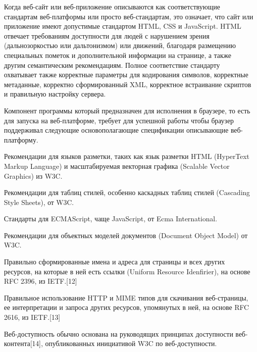 Когда веб-сайт или веб-приложение описываются как соответствующие стандартам веб-платформы или просто веб-стандартам, это означает, что сайт или приложение имеют допустимые стандартом HTML, CSS и JavaScript. HTML отвечает требованиям доступности для людей с нарушением зрения (дальнозоркостью или дальтонизмом) или движений, благодаря размещению специальных пометок и дополнительной информации на странице, а также другим семантическим рекомендациям. Полное соответствие стандарту охватывает также корректные параметры для кодирования символов, корректные метаданные, корректно сформированный XML, корректное встраивание скриптов и правильную настройку сервера.

Компонент программы который предназначен для исполнения в браузере, то есть для запуска на веб-платформе, требует для успешной работы чтобы браузер поддерживал следующие основополагающие спецификации описывающие веб-платформу.

\begin{my_enumerate}
\item Рекомендации для языков разметки, таких как язык разметки HTML (HyperText Markup Language) и масштабируемая векторная графика (Scalable Vector Graphics) из W3C.
\item Рекомендации для таблиц стилей, особенно каскадных таблиц стилей (Cascading Style Sheets), от W3C.
\item Стандарты для ECMAScript, чаще JavaScript, от Ecma International.
\item Рекомендации для объектных моделей документов (Document Object Model) от W3C.
\item Правильно сформированные имена и адреса для страницы и всех других ресурсов, на которые в ней есть ссылки (Uniform Resource Idenfirier), на основе RFC 2396, из IETF.[12]
\item Правильное использование HTTP и MIME типов для скачивания веб-страницы, ее интерпретации и запроса других ресурсов, упомянутых в ней, на основе RFC 2616, из IETF.[13]
\item Веб-доступность обычно основана на руководящих принципах доступности веб-контента[14], опубликованных инициативой W3C по веб-доступности.
\end{my_enumerate}

